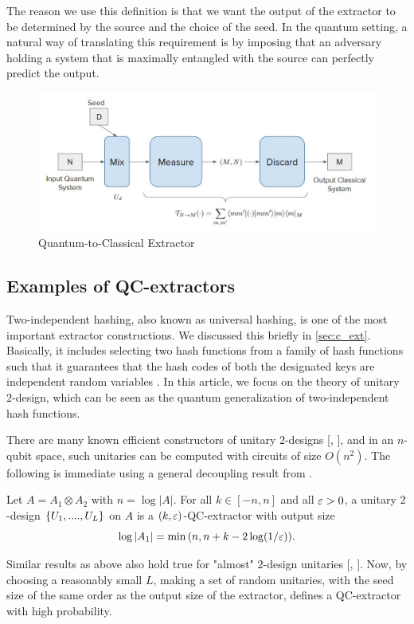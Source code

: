 The reason we use this definition is that we want the output of the extractor to be determined by the source and the choice of the seed. In the quantum setting, a natural way of translating this requirement is by imposing that an adversary holding a system that is maximally entangled with the source can perfectly predict the output.

\begin{figure}
    \centering
    \includegraphics[scale=0.6]{Images/QC_extractor_definition.jpg}
    \caption{Quantum-to-Classical Extractor}
    \label{fig:qc_extractor}
\end{figure}

\subsection{Examples of QC-extractors}
 Two-independent hashing, also known as universal hashing, is one of the most important extractor constructions. We discussed this briefly in \autoref{sec:c_ext}. Basically, it includes selecting two hash functions from a family of hash functions such that it guarantees that the hash codes of both the designated keys are independent random variables \cite{impagliazzo1989pseudo}. In this article, we focus on the theory of unitary $2$-design, which can be seen as the quantum generalization of two-independent hash functions. 


There are many known efficient constructors of unitary $2$-designs [\cite{grossunitary}, \cite{dankert2design}], and in an $n$-qubit space, such unitaries can be computed with circuits of size $O(n^2)$. The following is immediate using a general decoupling result from \cite{dupuisdecoupling,oneshotdecoupling}.

\begin{corollary}
    Let $A = A_{1} \otimes A_{2}$ with $n = \log |A|$. For all $k \in [-n, n]$ and all $\varepsilon > 0$, a unitary $2$-design $\{U_1, ...., U_L\}$ on $A$ is a $(k, \varepsilon)$-QC-extractor with output size 
    $$\log |A_1| = \min{(n, n+k-2\log (1/\ensuremath{\varepsilon}))}.$$
\end{corollary}
Similar results as above also hold true for "almost" $2$-design unitaries [\cite{osxehrtomamichel}, \cite{oszehrthesis}]. Now, by choosing a reasonably small $L$, making a set of random unitaries, with the seed size of the same order as the output size of the extractor, defines a QC-extractor with high probability. 




